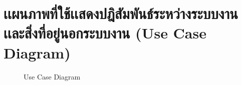 \documentclass[14pt,oneside,openright,a4paper]{cpe-thai-project}
\begin{document}
\section{เเผนภาพที่ใช้เเสดงปฎิสัมพันธ์ระหว่างระบบงานเเละสิ่งที่อยู่นอกระบบงาน (Use Case Diagram)}

  \begin{figure}[!h]\centering
    \setlength{\fboxrule}{0.5mm} %
    \setlength{\fboxsep}{0.5cm}
    \caption{Use Case Diagram}\label{fig:usecasediagram}
  \end{figure}
\end{document}
